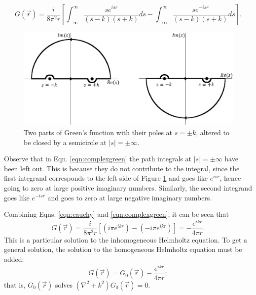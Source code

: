 %
\begin{equation}
\label{eqn:complexgreen}
G(\vec{r})=\frac{i}{8\pi^2r}\left[ \int_{-\infty}^\infty \frac{se^{isr}}{(s-k)(s+k)}ds-\int_{-\infty}^\infty \frac{se^{-isr}}{(s-k)(s+k)}ds \right].
\end{equation}
%
\begin{figure}
  \centering
    \includegraphics[width=\textwidth]{Figures/complexgreen} 
  \caption{Two parts of Green's function with their poles at $s=\pm k$, altered to be closed by a semicircle at $|s|=\pm\infty$.}
  \label{fig:complexgreen}
\end{figure}

Observe that in Eqn. \ref{eqn:complexgreen} the path integrals at $|s|=\pm\infty$ have been left out. This is because they do not contribute to the integral, since the first integrand corresponds to the left side of Figure \ref{fig:complexgreen} and goes like $e^{isr}$, hence going to zero at large positive imaginary numbers. Similarly, the second integrand goes like $e^{-isr}$ and goes to zero at large negative imaginary numbers.

Combining Eqns. \ref{eqn:cauchy} and \ref{eqn:complexgreen}, it can be seen that
%
\begin{equation}
\nonumber
G(\vec{r})=\frac{i}{8\pi^2r}[(i\pi e^{ikr})-(-i\pi e^{ikr})]=-\frac{e^{ikr}}{4\pi r}.
\end{equation}
This is a particular solution to the inhomogeneous Helmholtz equation. To get a general solution, the solution to the homogeneous Helmholtz equation must be added:
%
\begin{equation}
\label{eqn:greensolution}
G(\vec{r})=G_0(\vec{r})-\frac{e^{ikr}}{4\pi r};
\end{equation}
that is, $G_0(\vec{r})$ solves $(\nabla^2+k^2)G_0(\vec{r})=0$.

